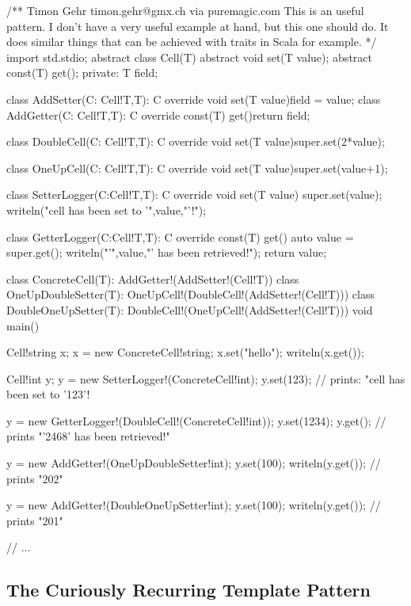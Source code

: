\begin{dcode}
/**
Timon Gehr timon.gehr@gmx.ch via puremagic.com 
This is an useful pattern. 
I don't have a very useful example at hand, but this one should do. 
It does similar things that can be achieved with traits in Scala for example.
*/
import std.stdio;
abstract class Cell(T){
       abstract void set(T value);
       abstract const(T) get();
private:
       T field;
}

class AddSetter(C: Cell!T,T): C{
       override void set(T value){field = value;}
}
class AddGetter(C: Cell!T,T): C{
       override const(T) get(){return field;}
}

class DoubleCell(C: Cell!T,T): C{
       override void set(T value){super.set(2*value);}
}

class OneUpCell(C: Cell!T,T): C{
       override void set(T value){super.set(value+1);} 
}

class SetterLogger(C:Cell!T,T): C{
       override void set(T value){
               super.set(value);
               writeln("cell has been set to '",value,"'!");
       }
}

class GetterLogger(C:Cell!T,T): C{
       override const(T) get(){
               auto value = super.get();
               writeln("'",value,"' has been retrieved!");
               return value;
       }
}

class ConcreteCell(T): AddGetter!(AddSetter!(Cell!T)){}
class OneUpDoubleSetter(T): OneUpCell!(DoubleCell!(AddSetter!(Cell!T))){}
class DoubleOneUpSetter(T): DoubleCell!(OneUpCell!(AddSetter!(Cell!T))){}
void main(){
       Cell!string x;
       x = new ConcreteCell!string;
       x.set("hello");
       writeln(x.get());

       Cell!int y;
       y = new SetterLogger!(ConcreteCell!int);
       y.set(123); // prints: "cell has been set to '123'!
       
       y = new GetterLogger!(DoubleCell!(ConcreteCell!int));
       y.set(1234);
       y.get(); // prints "'2468' has been retrieved!"

       y = new AddGetter!(OneUpDoubleSetter!int);
       y.set(100);
       writeln(y.get()); // prints "202"

       y = new AddGetter!(DoubleOneUpSetter!int);
       y.set(100);
       writeln(y.get()); // prints "201"

       // ...
}
\end{dcode}

\subsection{The Curiously Recurring Template Pattern}

